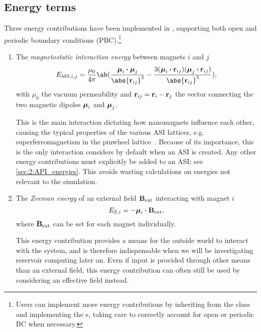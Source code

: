 \subsection{Energy terms}
Three energy contributions have been implemented in \hotspice, supporting both open and periodic boundary conditions (PBC).\footnote{
	Users can implement more energy contributions by inheriting from the  class and implementing the s, taking care to correctly account for open or periodic BC when necessary.
}
\begin{enumerate}
	\item The \textit{magnetostatic interaction energy} between magnets $i$ and $j$
	\begin{equation}
		E_{\mathrm{MS},i,j} = \frac{\mu_0}{4 \pi} \ab(\frac{\vc{\mu}_i \bcdot \vc{\mu}_j}{\abs{\vc{r}_{ij}}^3} - \frac{3(\vc{\mu}_i \bcdot \vc{r}_{ij}) (\vc{\mu}_j \bcdot \vc{r}_{ij})}{\abs{\vc{r}_{ij}}^5}) \mathrm{,}
		\label{eq:E_MS}
	\end{equation}
	with $\mu_0$ the vacuum permeability and $\boldsymbol{\mathbf{r}}_{ij} = \boldsymbol{\mathbf{r}}_i - \boldsymbol{\mathbf{r}}_j$ the vector connecting the two magnetic dipoles $\boldsymbol{\mathbf{\mu}}_i$ and $\boldsymbol{\mathbf{\mu}}_j$. \par
	This is the main interaction dictating how nanomagnets influence each other, causing the typical properties of the various ASI lattices, e.g. superferromagnetism in the pinwheel lattice~\cite{li2018pinwheel}.
	Because of its importance, this is the only interaction \hotspice considers by default when an ASI is created.
	Any other energy contributions must explicitly be added to an ASI; see \cref{sec:2:API_energies}.
	This avoids wasting calculations on energies not relevant to the simulation.
	
	\item The \textit{Zeeman energy} of an external field $\boldsymbol{\mathbf{B}}_\mathrm{ext}$ interacting with magnet $i$
	\begin{equation}
		E_{\mathrm{Z},i} = -\boldsymbol{\mathbf{\mu}}_i \boldsymbol{\cdot} \boldsymbol{\mathbf{B}}_\mathrm{ext} \mathrm{,} \label{eq:E_Z}
	\end{equation}
	where $\boldsymbol{\mathbf{B}}_\mathrm{ext}$ can be set for each magnet individually. \par
	This energy contribution provides a means for the outside world to interact with the system, and is therefore indispensable when we will be investigating reservoir computing later on.
	Even if input is provided through other means than an external field, this energy contribution can often still be used by considering an effective field instead.
	

\end{enumerate}
